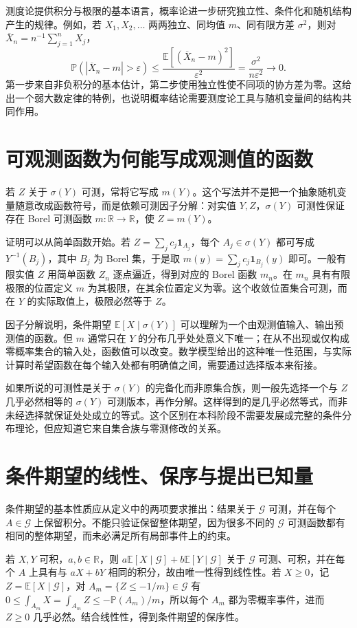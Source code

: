 测度论提供积分与极限的基本语言，概率论进一步研究独立性、条件化和随机结构产生的规律。例如，若 $X_1,X_2,\ldots$ 两两独立、同均值 $m$、同有限方差 $\sigma^2$，则对 $\overline X_n=n^{-1}\sum_{j=1}^{n}X_j$，
\[
 \mathbb P(|\overline X_n-m|>\varepsilon)
 \leq\frac{\mathbb E[(\overline X_n-m)^2]}{\varepsilon^2}
 =\frac{\sigma^2}{n\varepsilon^2}\longrightarrow0.
\]
第一步来自非负积分的基本估计，第二步使用独立性使不同项的协方差为零。这给出一个弱大数定律的特例，也说明概率结论需要测度论工具与随机变量间的结构共同作用。

\section{可观测函数为何能写成观测值的函数}
若 $Z$ 关于 $\sigma(Y)$ 可测，常将它写成 $m(Y)$。这个写法并不是把一个抽象随机变量随意改成函数符号，而是依赖可测因子分解：对实值 $Y,Z$，$\sigma(Y)$ 可测性保证存在 Borel 可测函数 $m:\mathbb R\to\mathbb R$，使 $Z=m(Y)$。

证明可以从简单函数开始。若 $Z=\sum_jc_j\mathbf1_{A_j}$，每个 $A_j\in\sigma(Y)$ 都可写成 $Y^{-1}(B_j)$，其中 $B_j$ 为 Borel 集，于是取 $m(y)=\sum_jc_j\mathbf1_{B_j}(y)$ 即可。一般有限实值 $Z$ 用简单函数 $Z_n$ 逐点逼近，得到对应的 Borel 函数 $m_n$。在 $m_n$ 具有有限极限的位置定义 $m$ 为其极限，在其余位置定义为零。这个收敛位置集合可测，而在 $Y$ 的实际取值上，极限必然等于 $Z$。

因子分解说明，条件期望 $\mathbb E[X\mid\sigma(Y)]$ 可以理解为一个由观测值输入、输出预测值的函数。但 $m$ 通常只在 $Y$ 的分布几乎处处意义下唯一；在从不出现或仅构成零概率集合的输入处，函数值可以改变。数学模型给出的这种唯一性范围，与实际计算时希望函数在每个输入处都有明确值之间，需要通过选择版本来衔接。

如果所说的可测性是关于 $\sigma(Y)$ 的完备化而非原集合族，则一般先选择一个与 $Z$ 几乎必然相等的 $\sigma(Y)$ 可测版本，再作分解。这样得到的是几乎必然等式，而非未经选择就保证处处成立的等式。这个区别在本科阶段不需要发展成完整的条件分布理论，但应知道它来自集合族与零测修改的关系。

\section{条件期望的线性、保序与提出已知量}
条件期望的基本性质应从定义中的两项要求推出：结果关于 $\mathcal G$ 可测，并在每个 $A\in\mathcal G$ 上保留积分。不能只验证保留整体期望，因为很多不同的 $\mathcal G$ 可测函数都有相同的整体期望，而未必满足所有局部事件上的约束。

若 $X,Y$ 可积，$a,b\in\mathbb R$，则
$a\mathbb E[X\mid\mathcal G]+b\mathbb E[Y\mid\mathcal G]$
关于 $\mathcal G$ 可测、可积，并在每个 $A$ 上具有与 $aX+bY$ 相同的积分，故由唯一性得到线性性。若 $X\geq0$，记 $Z=\mathbb E[X\mid\mathcal G]$，对 $A_m=\{Z\leq-1/m\}\in\mathcal G$ 有
$0\leq\int_{A_m}X=\int_{A_m}Z\leq-\mathbb P(A_m)/m$，所以每个 $A_m$ 都为零概率事件，进而 $Z\geq0$ 几乎必然。结合线性性，得到条件期望的保序性。

